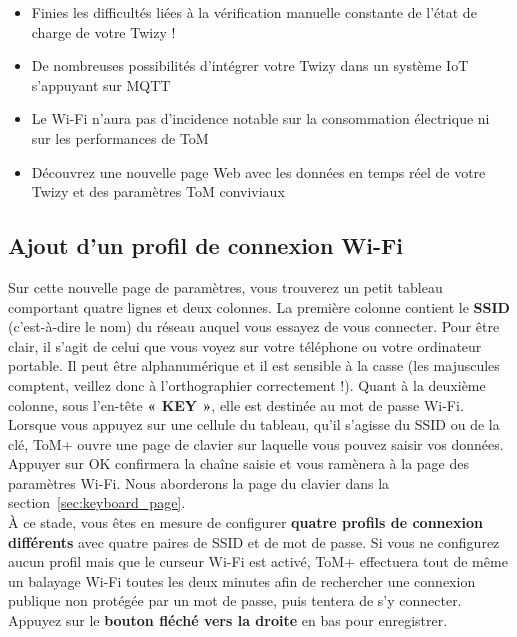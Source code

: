 \begin{itemize}
    \item Finies les difficultés liées à la vérification manuelle constante de l’état de charge de votre Twizy !
    \item De nombreuses possibilités d’intégrer votre Twizy dans un système IoT s’appuyant sur MQTT
    \item Le Wi-Fi n’aura pas d’incidence notable sur la consommation électrique ni sur les performances de ToM 
    \item Découvrez une nouvelle page Web avec les données en temps réel de votre Twizy et des paramètres ToM conviviaux
\end{itemize}

\subsection{Ajout d’un profil de connexion Wi-Fi}
\label{sec:add_wifi_profile}

Sur cette nouvelle page de paramètres, vous trouverez un petit tableau comportant quatre lignes et deux colonnes.
La première colonne contient le \textbf{SSID} (c'est-à-dire le nom) du réseau auquel vous essayez de vous connecter. 
Pour être clair, il s'agit de celui que vous voyez sur votre téléphone ou votre ordinateur portable. Il peut être alphanumérique et 
il est sensible à la casse (les majuscules comptent, veillez donc à l'orthographier correctement !).
Quant à la deuxième colonne, sous l’en-tête \textbf{« KEY »}, elle est destinée au mot de passe Wi-Fi.\\

Lorsque vous appuyez sur une cellule du tableau, qu’il s’agisse du SSID ou de la clé, ToM+ ouvre une page de clavier
sur laquelle vous pouvez saisir vos données. Appuyer sur OK confirmera la chaîne saisie et
vous ramènera à la page des paramètres Wi-Fi. Nous aborderons la page du clavier dans la section~\ref{sec:keyboard_page}.\\

À ce stade, vous êtes en mesure de configurer \textbf{quatre profils de connexion différents} avec quatre paires de SSID
et de mot de passe. Si vous ne configurez aucun profil mais que le curseur Wi-Fi est activé, ToM+ effectuera tout de même
un balayage Wi-Fi toutes les deux minutes afin de rechercher une connexion publique non protégée par un mot de passe,
puis tentera de s’y connecter. Appuyez sur le \textbf{bouton fléché vers la droite} en bas pour enregistrer.\\

